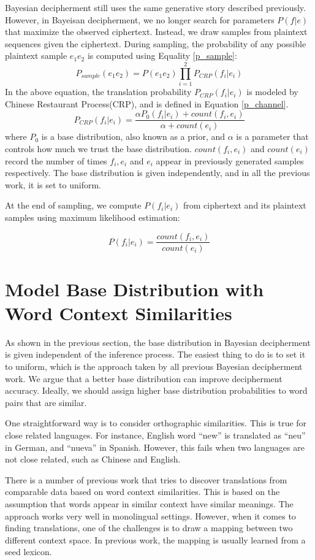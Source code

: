 Bayesian decipherment still uses the same generative story described previously. However, in Bayeisan decipherment, we no longer search for parameters $P(f|e)$ that maximize the observed ciphertext. Instead, we draw samples from plaintext sequences given the ciphertext. During sampling, the probability of any possible plaintext sample $e_{1}e_{2}$ is computed using Equality \ref{p_sample}:
%
\[
\label{p_sample}
P_{sample}(e_{1}e_{2}) =  P(e_{1}e_{2}) \prod_{i=1}^{2}P_{CRP}(f_{i}|e_{i})
\]
%
In the above equation, the translation probability $P_{CRP}(f_{i}|e_{i})$ is modeled by Chinese Restaurant Process(CRP), and is defined in Equation \ref{p_channel}.
%
\[
\label{p_channel}
P_{CRP}(f_{i}|e_{i}) = \frac{\alpha P_0(f_{i}|e_{i})+count(f_{i},e_{i})}{\alpha+count(e_{i})}
\]
%
where $P_{0}$ is a base distribution, also known as a prior, and $\alpha$ is a parameter that controls how much we trust the base distribution. $count(f_{i},e_{i})$ and $count(e_{i})$ record the number of times $f_{i},e_{i}$ and $e_{i}$ appear in previously generated samples respectively. The base distribution is given independently, and in all the previous work, it is set to uniform.

At the end of sampling, we compute $P(f_{i}|e_{i})$ from ciphertext and its plaintext samples using maximum likelihood estimation:

\[
\label{mlh_estimation}
P(f_{i}|e_{i}) =  \frac{count(f_{i},e_{i})}{count(e_{i})}
\]

\section{Model Base Distribution with Word Context Similarities}
As shown in the previous section, the base distribution in Bayesian decipherment is given independent of the inference process. The easiest thing to do is to set it to uniform, which is the approach taken by all previous Bayesian decipherment work. We argue that a better base distribution can improve decipherment accuracy. Ideally, we should assign higher base distribution probabilities to word pairs that are similar.

One straightforward way is to consider orthographic similarities. This is true for close related languages. For instance, English word ``new'' is translated as ``neu'' in German, and ``nueva'' in Spanish. However, this fails when two languages are not close related, such as Chinese and English.

There is a number of previous work that tries to discover translations from comparable data based on word context similarities. This is based on the assumption that words appear in similar context have similar meanings. The approach works very well in monolingual settings. However, when it comes to finding translations, one of the challenges is to draw a mapping between two different context space. In previous work, the mapping is usually learned from a seed lexicon.

